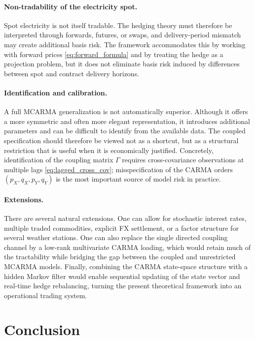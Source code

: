 \documentclass[10pt,a4paper,reqno]{amsart}
\newcommand{\1}{\mathbbm{1}}
\begin{document}
\paragraph{Non-tradability of the electricity spot.}
Spot electricity is not itself tradable. The hedging theory must therefore be
interpreted through forwards, futures, or swaps, and delivery-period mismatch
may create additional basis risk. The framework accommodates this by working
with forward prices \eqref{eq:forward_formula} and by treating the hedge as a
projection problem, but it does not eliminate basis risk induced by differences
between spot and contract delivery horizons.

\paragraph{Identification and calibration.}
A full MCARMA generalization is not automatically superior. Although it offers a
more symmetric and often more elegant representation, it introduces additional
parameters and can be difficult to identify from the available data. The coupled
specification should therefore be viewed not as a shortcut, but as a structural
restriction that is useful when it is economically justified. Concretely,
identification of the coupling matrix \(\Gamma\) requires cross-covariance
observations at multiple lags \eqref{eq:lagged_cross_cov}; misspecification of
the CARMA orders \((p_X,q_X,p_Y,q_Y)\) is the most important source of model
risk in practice.

\paragraph{Extensions.}
There are several natural extensions. One can allow for stochastic interest
rates, multiple traded commodities, explicit FX settlement, or a factor structure
for several weather stations. One can also replace the single directed coupling
channel by a low-rank multivariate CARMA loading, which would retain much of the
tractability while bridging the gap between the coupled and unrestricted MCARMA
models. Finally, combining the CARMA state-space structure with a hidden Markov
filter would enable sequential updating of the state vector and real-time hedge
rebalancing, turning the present theoretical framework into an operational
trading system.

\section{Conclusion}\label{sec:conclusion}
\end{document}
